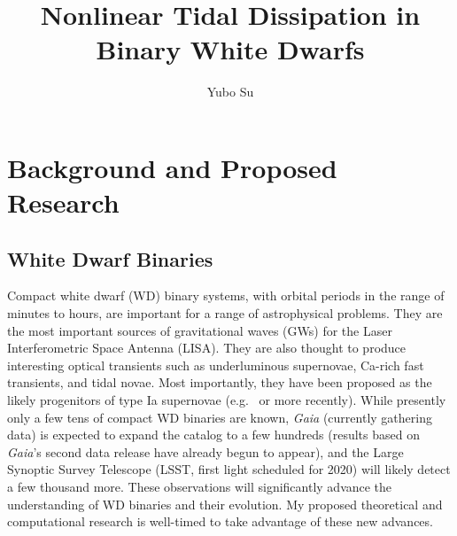 \documentclass[12pt,
        usenames, %
        dvipsnames %
    ]{article}
\begin{document}
\renewcommand*{\sectionautorefname}{Section}

\singlespacing

\pagestyle{fancy}
\rhead{}
\cfoot{\thepage/\pageref{LastPage}}

\title{Nonlinear Tidal Dissipation in Binary White Dwarfs}
\author{Yubo Su}
\date{}

\maketitle

\section{Background and Proposed Research}

\subsection{White Dwarf Binaries}

Compact white dwarf (WD) binary systems, with orbital periods in the range of
minutes to hours, are important for a range of astrophysical problems. They are
the most important sources of gravitational waves (GWs) for the Laser
Interferometric Space Antenna (LISA)\cite{lisa}. They are also thought to
produce interesting optical transients such as underluminous
supernovae\cite{underlum}, Ca-rich fast transients\cite{carich}, and tidal
novae\cite{tidal_novae}. Most importantly, they have been proposed as the likely
progenitors of type Ia supernovae (e.g.~\cite{Ia0,webbink} or more
recently\cite{Ia1,Ia2}). While presently only a few tens of compact WD binaries
are known\cite{lsst_wd}, \emph{Gaia} (currently gathering data) is expected to
expand the catalog to a few hundreds\cite{lsst_wd} (results based on
\emph{Gaia}'s second data release have already begun to
appear\cite{gaiaDD,gaiaDD2}), and the Large Synoptic Survey Telescope (LSST,
first light scheduled for 2020) will likely detect a few thousand
more\cite{lsst_wd}. These observations will significantly advance the
understanding of WD binaries and their evolution. My proposed theoretical and
computational research is well-timed to take advantage of these new advances.
\end{document}
